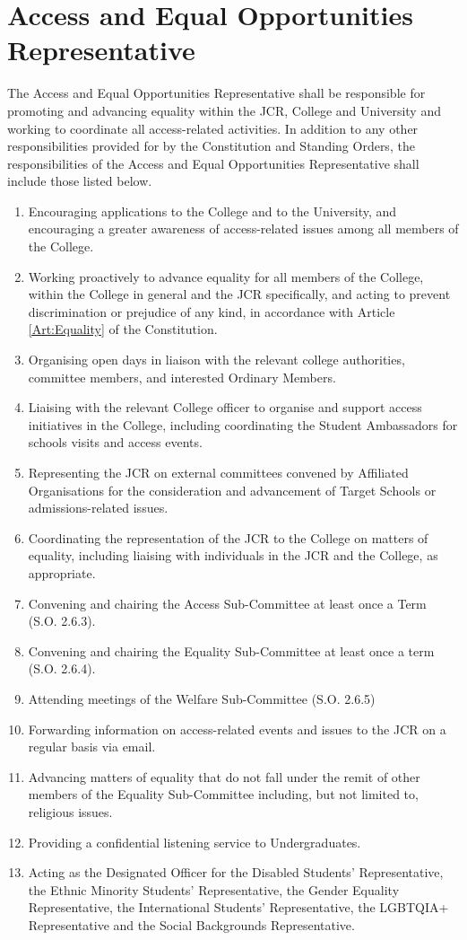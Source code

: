 \section{Access and Equal Opportunities Representative}
\npara The Access and Equal Opportunities Representative shall be responsible for promoting and advancing equality within the JCR, College and University and working to coordinate all access-related activities. 
\npara In addition to any other responsibilities provided for by the Constitution and Standing Orders, the responsibilities of the Access and Equal Opportunities Representative shall include those listed below.
\begin{enumerate}
	\item Encouraging applications to the College and to the University, and encouraging a greater awareness of access-related issues among all members of the College.     
	\item Working proactively to advance equality for all members of the College, within the College in general and the JCR specifically, and acting to prevent discrimination or prejudice of any kind, in accordance with Article \ref{Art:Equality} of the Constitution. 
	\item Organising open days in liaison with the relevant college authorities, committee members, and interested Ordinary Members.
	\item Liaising with the relevant College officer to organise and support access initiatives in the College, including coordinating the Student Ambassadors for schools visits and access events.
	\item Representing the JCR on external committees convened by Affiliated Organisations for the consideration and advancement of Target Schools or admissions-related issues.
	\item Coordinating the representation of the JCR to the College on matters of equality, including liaising with individuals in the JCR and the College, as appropriate.
	\item Convening and chairing the Access Sub-Committee at least once a Term (S.O. 2.6.3).
	\item Convening and chairing the Equality Sub-Committee at least once a term (S.O. 2.6.4).
	\item Attending meetings of the Welfare Sub-Committee (S.O. 2.6.5)     
	\item Forwarding information on access-related events and issues to the JCR on a regular basis via email. 
	\item Advancing matters of equality that do not fall under the remit of other members of the Equality Sub-Committee including, but not limited to, religious issues. 
	\item Providing a confidential listening service to Undergraduates.
	\item Acting as the Designated Officer for the Disabled Students’ Representative, the Ethnic Minority Students’ Representative, the Gender Equality Representative, the International Students’ Representative, the LGBTQIA+ Representative and the Social Backgrounds Representative.
\end{enumerate}

